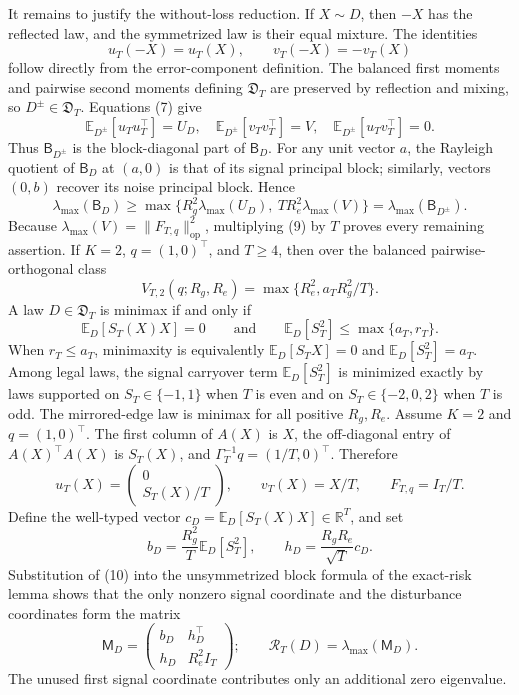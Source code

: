 It remains to justify the without-loss reduction.  If \(X\sim D\), then \(-X\) has the reflected law, and the symmetrized law is their equal mixture.  The identities
\[
u_T(-X)=u_T(X),
\qquad
v_T(-X)=-v_T(X)
\tag{7}
\]
follow directly from the error-component definition.  The balanced first moments and pairwise second moments defining \(\mathfrak D_T\) are preserved by reflection and mixing, so \(D^{\pm}\in\mathfrak D_T\).  Equations (7) give
\[
\mathbb E_{D^{\pm}}[u_Tu_T^{\top}]=U_D,
\quad
\mathbb E_{D^{\pm}}[v_Tv_T^{\top}]=V,
\quad
\mathbb E_{D^{\pm}}[u_Tv_T^{\top}]=0.
\tag{8}
\]
Thus \(\mathsf B_{D^{\pm}}\) is the block-diagonal part of \(\mathsf B_D\).  For any unit vector \(a\), the Rayleigh quotient of \(\mathsf B_D\) at \((a,0)\) is that of its signal principal block; similarly, vectors \((0,b)\) recover its noise principal block.  Hence
\[
\lambda_{\max}(\mathsf B_D)
\ge
\max\{R_g^2\lambda_{\max}(U_D),\ T R_e^2\lambda_{\max}(V)\}
=\lambda_{\max}(\mathsf B_{D^{\pm}}).
\tag{9}
\]
Because \(\lambda_{\max}(V)=\lVert F_{T,q}\rVert_{\mathrm{op}}^2\), multiplying (9) by \(T\) proves every remaining assertion.
If \(K=2\), \(q=(1,0)^{\top}\), and \(T\ge4\), then over the balanced pairwise-orthogonal class
\[
V_{T,2}(q;R_g,R_e)=\max\{R_e^2,a_TR_g^2/T\}.
\]
A law \(D\in\mathfrak D_T\) is minimax if and only if
\[
\mathbb E_D[S_T(X)X]=0
\qquad\text{and}\qquad
\mathbb E_D[S_T^2]\le\max\{a_T,r_T\}.
\]
When \(r_T\le a_T\), minimaxity is equivalently \(\mathbb E_D[S_TX]=0\) and \(\mathbb E_D[S_T^2]=a_T\).  Among legal laws, the signal carryover term \(\mathbb E_D[S_T^2]\) is minimized exactly by laws supported on \(S_T\in\{-1,1\}\) when \(T\) is even and on \(S_T\in\{-2,0,2\}\) when \(T\) is odd.  The mirrored-edge law is minimax for all positive \(R_g,R_e\).
Assume \(K=2\) and \(q=(1,0)^{\top}\).  The first column of \(A(X)\) is \(X\), the off-diagonal entry of \(A(X)^{\top}A(X)\) is \(S_T(X)\), and \(\Gamma_T^{-1}q=(1/T,0)^{\top}\).  Therefore
\[
u_T(X)=\begin{pmatrix}0\\S_T(X)/T\end{pmatrix},
\qquad
v_T(X)=X/T,
\qquad
F_{T,q}=I_T/T.
\tag{10}
\]
Define the well-typed vector \(c_D=\mathbb E_D[S_T(X)X]\in\mathbb R^T\), and set
\[
b_D=\frac{R_g^2}{T}\mathbb E_D[S_T^2],
\qquad
h_D=\frac{R_gR_e}{\sqrt T}c_D.
\tag{11}
\]
Substitution of (10) into the unsymmetrized block formula of the exact-risk lemma shows that the only nonzero signal coordinate and the disturbance coordinates form the matrix
\[
\mathsf M_D=
\begin{pmatrix}
b_D&h_D^{\top}\\
h_D&R_e^2I_T
\end{pmatrix};
\qquad
\mathcal R_T(D)=\lambda_{\max}(\mathsf M_D).
\tag{12}
\]
The unused first signal coordinate contributes only an additional zero eigenvalue.

